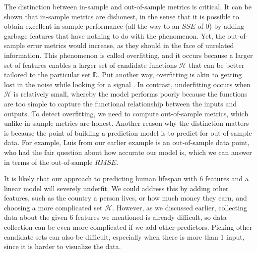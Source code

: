 \documentclass[12pt]{article}
\begin{document}
	The distinction between in-sample and out-of-sample metrics is critical.
	It can be shown that in-sample metrics are dishonest, in the sense that it is
	possible to obtain excellent in-sample performance (all the way to an $SSE$ of $0$)
	by adding garbage features that have nothing to do with the phenomenon.
	Yet, the out-of-sample error metrics would increase, as they should
	in the face of unrelated information. This phenomenon is called overfitting,
	and it occurs because a larger set of features enables a larger
	set of candidate functions $\mathcal{H}$ that can be better tailored
	to the particular set $\mathbb{D}$. Put another way, overfitting
	is akin to getting lost in the noise while looking for a signal
	\cite{Silver-signal-and-noise}. In contrast, underfitting occurs
	when $\mathcal{H}$ is relatively small, whereby the model performs
	poorly because the functions are too simple to capture the functional
	relationship between the inputs and outputs. To detect overfitting,
	we need to compute out-of-sample metrics, which unlike in-sample
	metrics are honest. Another reason why the distinction matters is because
	the point of building a prediction model is to predict for out-of-sample
	data. For example, Luis from our earlier example is an out-of-sample data
	point, who had the fair question about how accurate our model is,
	which we can answer in terms of the out-of-sample $RMSE$.
	
	It is likely that our approach to predicting human lifespan with 6 features
	and a linear model will severely underfit. We could address this by adding
	other features, such as the country a person lives, or how much money they
	earn, and choosing a more complicated set $\mathcal{H}$.
	However, as we discussed earlier, collecting data about the given 6 features
	we mentioned is already difficult, so data collection can be even more
	complicated if we add other predictors. Picking other candidate sets can
	also be difficult, especially when there is more than 1 input,
	since it is harder to visualize the data.
	
\end{document}
